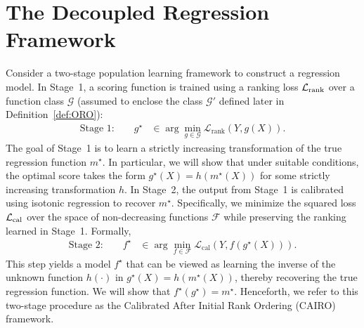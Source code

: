 \documentclass[11pt]{article}
\theoremstyle{plain}
\theoremstyle{plain}
\theoremstyle{plain}
\theoremstyle{plain}
\theoremstyle{plain}
\theoremstyle{plain}
\theoremstyle{plain}
\begin{document}
\section{The Decoupled Regression Framework}
\label{sec:our_method}
Consider a two-stage population learning framework to construct a regression model.
In Stage~1, a scoring function is trained using a ranking loss $\mathcal{L}_\textup{rank}$ over a function class $\mathcal{G}$ (assumed to enclose the class $\mathcal{G}'$ defined later in Definition~\ref{def:ORO}): 
\begin{align}\label{eq:stage1}
    \text{Stage 1:}\qquad g^{\star} &\in \arg\min_{g \in \mathcal{G}} \mathcal{L}_\text{rank}(Y, g(X)).
\end{align}
The goal of Stage~1 is to learn a strictly increasing transformation of the true regression function $m^{\star}$. In particular, we will show that under suitable conditions, the optimal score takes the form $g^{\star}(X) = h(m^{\star}(X))$ for some strictly increasing transformation $h$. In Stage~2, the output from Stage~1 is calibrated using isotonic regression to recover $m^{\star}$.  Specifically, we minimize the squared loss $\mathcal{L}_\textup{cal}$ over the space of non-decreasing functions $\mathcal{F}$ while preserving the ranking learned in Stage~1. Formally,
\begin{align}\label{eq:stage2}
    \text{Stage 2:}\qquad f^{\star} &\in \arg\min_{f \in \mathcal{F}} \mathcal{L}_\text{cal}(Y, f(g^{\star}(X))).
\end{align}
This step yields a model $f^{\star}$ that can be viewed as learning the inverse of the unknown function $h(\cdot)$ in $g^{\star}(X) = h(m^{\star}(X))$, thereby recovering the true regression function. We will show that $f^{\star}(g^{\star}) = m^{\star}$.  Henceforth, we refer to this two-stage procedure as the Calibrated After Initial Rank Ordering (CAIRO) framework. %

\end{document}
